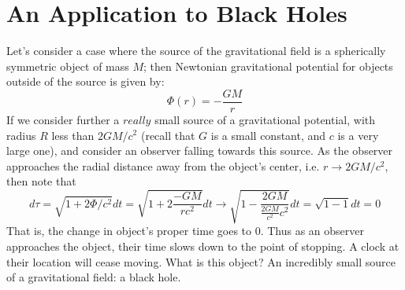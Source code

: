 \documentclass[12pt]{article}
\theoremstyle{definition}
\theoremstyle{remark}
\begin{document}
\section{An Application to Black Holes}
Let's consider a case where the source of the gravitational field is a spherically symmetric object of mass $M$; then Newtonian gravitational potential for objects outside of the source is given by:
\begin{equation}
\Phi(r)=-\frac{GM}{r}
\end{equation}
If we consider further a $really$ small source of a gravitational potential, with radius $R$ less than $2GM/c^2$ (recall that $G$ is a small constant, and $c$ is a very large one), and consider an observer falling towards this source. As the observer approaches the radial distance away from the object's center, i.e. $r\rightarrow 2GM/c^2$, then note that
\begin{equation}
d\tau=\sqrt{1+2\Phi/c^2}dt=\sqrt{1+2\frac{-GM}{rc^2}}dt\rightarrow\sqrt{1-\frac{2GM}{\frac{2GM}{c^2}c^2}}dt=\sqrt{1-1}dt=0
\end{equation}
That is, the change in object's proper time goes to 0. Thus as an observer approaches the object, their time slows down to the point of stopping. A clock at their location will cease moving. What is this object? An incredibly small source of a gravitational field: a black hole. 












































\end{document}
